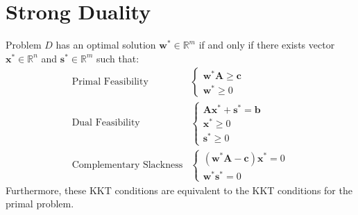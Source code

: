 \section{Strong Duality}
\begin{lemma} Problem $D$ has an optimal solution $\mathbf{w}^* \in \mathbb{R}^m$ if and only if there exists vector $\mathbf{x}^* \in \mathbb{R}^n$ and $\mathbf{s}^* \in \mathbb{R}^m$ such that:
\begin{align}
\text{Primal Feasibility}&\left\{ 
\begin{aligned}
\mathbf{w}^*\mathbf{A} \geq \mathbf{c}\\
\mathbf{w}^* \geq 0
\label{eqn:KKTDual1}
\end{aligned}\right.\\
\text{Dual Feasibility}&\left\{ 
\begin{aligned}
\mathbf{A}\mathbf{x}^* + \mathbf{s}^* = \mathbf{b}\\
\mathbf{x}^* \geq 0\\
\mathbf{s}^* \geq 0
\label{eqn:KKTDual2}
\end{aligned}\right.\\
\text{Complementary Slackness}&\left\{ 
\begin{aligned}
\left(\mathbf{w}^*\mathbf{A} - \mathbf{c}\right)\mathbf{x}^* = 0\\
\mathbf{w}^*\mathbf{s}^* = 0
\label{eqn:KKTDual3}
\end{aligned}\right.
\end{align}
Furthermore, these KKT conditions are equivalent to the KKT conditions for the primal problem.
\label{lem:DualKKT}
\end{lemma}
